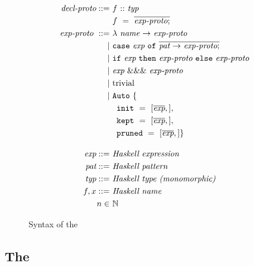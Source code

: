 \begin{figure}
\begin{align*}
  \textit{decl-proto} ::= &
  ~ f ~ \mathtt{::} ~ \textit{typ} \\ &
  ~ f ~ = ~ \overline{\textit{exp-proto} ;}
  \\
  \textit{exp-proto}~ ::= &
    ~ \mathtt{\lambda} ~ \textit{name} ~ \mathtt{\rightarrow} ~ \textit{exp-proto} \\ \mid &
    ~ \mathtt{case} ~ \textit{exp} ~ \mathtt{of} ~ \overline{\textit{pat} ~ \mathtt{\rightarrow} ~ \textit{exp-proto} ;} \\ \mid &
    ~ \mathtt{if} ~ \textit{exp} ~ \mathtt{then} ~ \textit{exp-proto} ~ \mathtt{else} ~ \textit{exp-proto} \\ \mid &
    ~ \textit{exp} ~ \&\&\& ~ \textit{exp-proto} \\ \mid &
    ~ \text{trivial} \\ \mid &
    ~ \mathtt{Auto} ~ \{ \\ &
    ~ \hspace{0.5em} \texttt{init}~=~[\overline{\textit{exp}},], \\ &
    ~ \hspace{0.5em} \texttt{kept}~=~[\overline{\textit{exp}},], \\ &
    ~ \hspace{0.5em} \texttt{pruned}~=~[\overline{\textit{exp}},] \} 
  \\[1em]
  \textit{exp} ::= & ~ \textit{Haskell expression} 
  \\
  \textit{pat} ::= & ~ \textit{Haskell pattern} 
  \\
  \textit{typ} ::= & ~ \textit{Haskell type (monomorphic)} 
  \\
  f, x ::= & ~ \textit{Haskell name} 
  \\
  n \in & ~ \mathbb{N}
\end{align*}
\caption{Syntax of the \LangB}
\label{fig:langb-syntax}
\end{figure}


\subsection{The \LangB}
\label{sec:proto-proof-lang}

